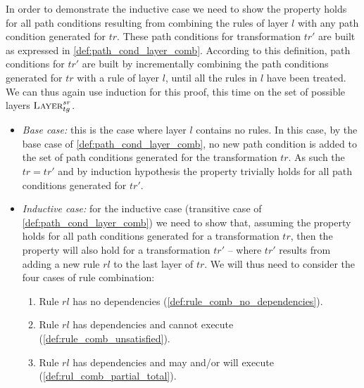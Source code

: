 \begin{ps}
In order to demonstrate the inductive case we need to show the property holds for all path conditions resulting from combining the rules of layer $l$ with any path condition generated for $tr$. These path conditions for transformation $tr'$ are built as expressed in \cref{def:path_cond_layer_comb}. According to this definition, path conditions for $tr'$ are built by incrementally combining the path conditions generated for $tr$ with a rule of layer $l$, until all the rules in $l$ have been treated. We can thus again use induction for this proof, this time on the set of possible layers $\textsc{Layer}^{sr}_{tg}$. 

\begin{itemize}
  \item \emph{Base case:} this is the case where layer $l$ contains no rules. In this case, by the base case of \cref{def:path_cond_layer_comb}, no new path condition is added to the set of path conditions generated for the transformation $tr$. As such the $tr=tr'$ and by induction hypothesis the property trivially holds for all path conditions generated for $tr'$.
  
  \item \emph{Inductive case:} for the inductive case (transitive case of \cref{def:path_cond_layer_comb}) we need to show that, assuming the property holds for all path conditions generated for a transformation $tr$, then the property will also hold for a transformation $tr'$ -- where $tr'$ results from adding a new rule $rl$ to the last layer of $tr$. We will thus need to consider the four  cases of rule combination:\vspace{.2cm} 
 
\begin{enumerate}
\item\label{lab:rule_case1} Rule $rl$ has no dependencies (\cref{def:rule_comb_no_dependencies}).
\item\label{lab:rule_case2} Rule $rl$ has dependencies and cannot execute (\cref{def:rule_comb_unsatisfied}).
\item\label{lab:rule_case3} Rule $rl$ has dependencies and may and/or will execute (\cref{def:rul_comb_partial_total}).
\end{enumerate}


\end{itemize}
\end{ps}
